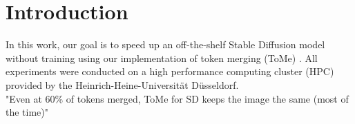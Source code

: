 \section{Introduction}
In this work, our goal is to speed up an off-the-shelf Stable Diffusion model without training using our implementation of token merging (ToMe) \cite{bolya2023tomesd}.
All experiments were conducted on a high performance computing cluster (HPC) provided by the Heinrich-Heine-Universität Düsseldorf.\\
"Even at 60\% of tokens merged, ToMe for SD keeps the image the same (most of the time)"